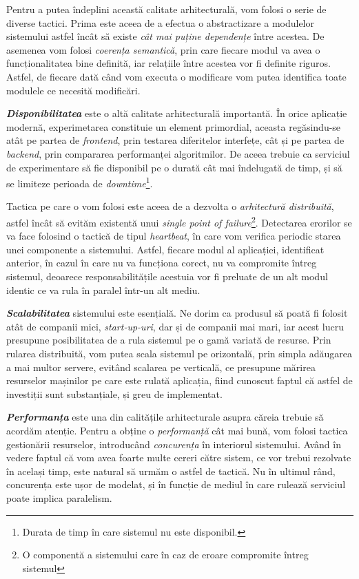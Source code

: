 Pentru a putea îndeplini această calitate arhitecturală, vom folosi o serie de diverse tactici. Prima este aceea de a efectua o abstractizare a modulelor sistemului astfel încât să existe \textit{cât mai puține dependențe} între acestea. De asemenea vom folosi \textit{coerența semantică}, prin care fiecare modul va avea o funcționalitatea bine definită, iar relațiile între acestea vor fi definite riguros. Astfel, de fiecare dată când vom executa o modificare vom putea identifica toate modulele ce necesită modificări.

\textbf{\textit{Disponibilitatea}} este o altă calitate arhitecturală importantă. În orice aplicație modernă, experimetarea constituie un element primordial, aceasta regăsindu-se atât pe partea de \textit{frontend}, prin testarea diferitelor interfețe, cât și pe partea de \textit{backend}, prin compararea performanței algoritmilor. De aceea trebuie ca serviciul de experimentare să fie disponibil pe o durată cât mai îndelugată de timp, și să se limiteze  perioada de \textit{downtime}\footnote{Durata de timp în care sistemul nu este disponibil.}.

Tactica pe care o vom folosi este aceea de a dezvolta o \textit{arhitectură distribuită}, astfel încât să evităm existentă unui \textit{single point of failure}\footnote{O componentă a sistemului care în caz de eroare compromite întreg sistemul}. Detectarea erorilor se va face folosind o tactică de tipul \textit{heartbeat}, în care vom verifica periodic starea unei componente a sistemului. Astfel, fiecare modul al aplicației, identificat anterior, în cazul în care nu va funcționa corect, nu va compromite întreg sistemul, deoarece responsabilitățile acestuia vor fi preluate de un alt modul identic ce va rula în paralel într-un alt mediu.

\textbf{\textit{Scalabilitatea}} sistemului este esențială. Ne dorim ca produsul să poată fi folosit atât de companii mici, \textit{start-up-uri}, dar și de companii mai mari, iar acest lucru presupune posibilitatea de a rula sistemul pe o gamă variată de resurse. Prin rularea distribuită, vom putea scala sistemul pe orizontală, prin simpla adăugarea a mai multor servere, evitând scalarea pe verticală, ce presupune mărirea resurselor mașinilor pe care este rulată aplicația, fiind cunoscut faptul că astfel de investiții sunt substanțiale, și greu de implementat.

\textbf{\textit{Performanța}} este una din calitățile arhitecturale asupra căreia trebuie să acordăm atenție. Pentru a obține o \textit{performanță} cât mai bună, vom folosi tactica gestionării resurselor, introducând \textit{concurența} în interiorul sistemului. Având în vedere faptul că vom avea foarte multe cereri către sistem, ce vor trebui rezolvate în același timp, este natural să urmăm o astfel de tactică. Nu în ultimul rând, concurența este ușor de modelat, și în funcție de mediul în care rulează serviciul poate implica paralelism.

